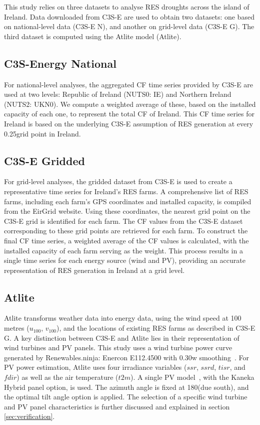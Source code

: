\documentclass[a4paper, 11pt]{article}
\begin{document}
This study relies on three datasets to analyse RES droughts across the island of Ireland. Data downloaded from C3S-E are used to obtain two datasets: one based on national-level data (C3S-E N), and another on grid-level data (C3S-E G). The third dataset is computed using the Atlite model (Atlite).

\subsection{C3S-Energy National}
\label{sec:c3se_n}

For national-level analyses, the aggregated CF time series provided by C3S-E are used at two levels: Republic of Ireland (NUTS0: IE) and Northern Ireland (NUTS2: UKN0). We compute a weighted average of these, based on the installed capacity of each one, to represent the total CF of Ireland. This CF time series for Ireland is based on the underlying C3S-E assumption of RES generation at every 0.25\textdegree grid point in Ireland.

\subsection{C3S-E Gridded}
\label{sec:c3se_g}

For grid-level analyses, the gridded dataset from C3S-E is used to create a representative time series for Ireland's RES farms. A comprehensive list of RES farms, including each farm’s GPS coordinates and installed capacity, is compiled from the EirGrid website. Using these coordinates, the nearest grid point on the C3S-E grid is identified for each farm. The CF values from the C3S-E dataset corresponding to these grid points are retrieved for each farm. To construct the final CF time series, a weighted average of the CF values is calculated, with the installed capacity of each farm serving as the weight. This process results in a single time series for each energy source (wind and PV), providing an accurate representation of RES generation in Ireland at a grid level.

\subsection{Atlite} 
\label{sec:atlite}

Atlite transforms weather data into energy data, using the wind speed at 100 metres ($u_{100}$, $v_{100}$), and the locations of existing RES farms as described in C3S-E G. A key distinction between C3S-E and Atlite lies in their representation of wind turbines and PV panels. This study uses a wind turbine power curve generated by Renewables.ninja: Enercon E112.4500 with 0.30w smoothing~\cite{staffell2016wake}. For PV power estimation, Atlite uses four irradiance variables ($ssr$, $ssrd$, $tisr$, and $fdir$) as well as the air temperature ($t2m$). A single PV model~\cite{beyer2004pv}, with the Kaneka Hybrid panel option, is used. The azimuth angle is fixed at 180\textdegree (due south), and the optimal tilt angle option is applied. The selection of a specific wind turbine and PV panel characteristics is further discussed and explained in section \ref{sec:verification}.
\end{document}
